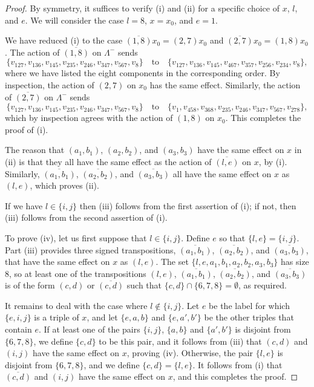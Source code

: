 \documentclass[10pt,a4paper]{amsart}
\newcommand{\lamm}{\Lambda^-}
\begin{document}
\begin{proof}
By symmetry, it suffices to verify (i) and (ii) for a specific choice of $x$, $l$, and $e$. We will consider 
the case $l = 8$, $x = x_0$, and $e = 1$.

We have reduced (i) to the case $\overline{(1, 8)}x_0 = (2, 7)x_0$ and $\overline{(2, 7)}x_0 = (1, 8)x_0$.
The action of $\overline{(1, 8)}$ on $\lamm$ sends $$
\{ v_{127},
v_{136},
v_{145},
v_{235},
v_{246},
v_{347},
v_{567},
v_{8}\} \quad \text{to} \quad 
\{ v_{127},
v_{136},
v_{145},
v_{467},
v_{357},
v_{256},
v_{234},
v_{8}\}
,$$ where we have listed the eight components in the corresponding order. By inspection, the action of $(2, 7)$ on
$x_0$ has the same effect. Similarly, the action of $\overline{(2, 7)}$ on $\lamm$ sends $$
\{ v_{127},
v_{136},
v_{145},
v_{235},
v_{246},
v_{347},
v_{567},
v_{8}\} \quad \text{to} \quad
\{ v_{1},
v_{458},
v_{368},
v_{235},
v_{246},
v_{347},
v_{567},
v_{278}\}
,$$ which by inspection agrees with the action of $(1, 8)$ on $x_0$. This completes the proof of (i).

The reason that $(a_1, b_1)$, $(a_2, b_2)$, and $(a_3, b_3)$ have the same effect on $x$ in (ii) is that they
all have the same effect as the action of $\overline{(l, e)}$ on $x$, by (i). Similarly,
$\overline{(a_1, b_1)}$, $\overline{(a_2, b_2)}$, and $\overline{(a_3, b_3)}$ all have the same effect on $x$
as $(l, e)$, which proves (ii).

If we have $l \in \{i, j\}$ then (iii) follows from the first assertion of (i); if not, then (iii) follows from
the second assertion of (i).

To prove (iv), let us first suppose that $l \in \{i, j\}$. Define $e$ so that $\{l, e\} = \{i, j\}$.
Part (iii) provides three signed transpositions, $\overline{(a_1, b_1)}$, $\overline{(a_2, b_2)}$, and 
$\overline{(a_3, b_3)}$, that have the same effect on $x$ as $(l, e)$. The set $\{l, e, a_1, b_1, a_2, b_2, a_3, b_3\}$
has size $8$, so at least one of the transpositions $(l, e)$, $\overline{(a_1, b_1)}$, $\overline{(a_2, b_2)}$, and 
$\overline{(a_3, b_3)}$ is of the form $(c, d)$ or $\overline{(c, d)}$ such that $\{c, d\} \cap \{6, 7, 8\} = \emptyset$, 
as required.

It remains to deal with the case where $l \not\in \{i, j\}$. Let $e$ be the label for which $\{e, i, j\}$
is a triple of $x$, and let $\{e, a, b\}$ and $\{e, a', b'\}$ be the other triples that contain $e$.
If at least one of the pairs $\{i, j\}$, $\{a, b\}$ and $\{a', b'\}$ is disjoint from $\{6, 7, 8\}$, we define
$\{c, d\}$ to be this pair, and it follows from (iii) that $(c, d)$ and $(i, j)$ have the same effect on $x$,
proving (iv). Otherwise, the pair $\{l, e\}$ is disjoint from $\{6, 7, 8\}$, and we define $\{c, d\} = \{l, e\}$.
It follows from (i) that $\overline{(c, d)}$ and $(i, j)$ have the same effect on $x$, and this completes the proof.
\end{proof}
\end{document}
